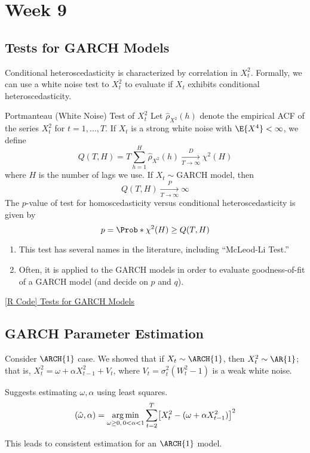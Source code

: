 \chapter{Week 9}
\section{Tests for GARCH Models}
Conditional heteroscedasticity is characterized by
correlation in $ X_t^2 $. Formally,
we can use a white noise test to $ X_t^2 $
to evaluate if $ X_t $ exhibits conditional heteroscedasticity.
\begin{Theorem}{Portmanteau (White Noise) Test of $ X_t^2 $}{}
    Let $ \hat{\rho}_{X^2}(h) $ denote the empirical ACF of the
    series $ X_t^2 $ for $ t=1,\ldots,T $. If $ X_t $
    is a strong white noise with $ \E{X^4}<\infty $, we define
    \[ Q(T,H)=T \sum_{h=1}^{H} \hat{\rho}_{X^2}(h)\xrightarrow[T\to\infty]{D}\chi^2(H) \]
    where $ H $ is the number of lags we use. If $ X_t \sim \text{GARCH} $
    model, then
    \[ Q(T,H)\xrightarrow[T\to\infty]{P}\infty \]
    The $ p $-value of test for homoscedasticity versus conditional
    heteroscedasticity is given by
    \[ p=\Prob*{\chi^2(H)\ge Q(T,H)} \]
\end{Theorem}
\begin{Remark}{}{}
    \begin{enumerate}[(1)]
        \item This test has several names in the literature, including
              ``McLeod-Li Test.''
        \item Often, it is applied to the GARCH models in order to evaluate goodness-of-fit
              of a GARCH model (and decide on $ p $ and $ q $).
    \end{enumerate}
\end{Remark}
\href{https://github.com/Hextical/university-notes/blob/master/year-3/semester-2/STAT 443/code/9.1 - Tests for GARCH Models.R}{[R Code] Tests for GARCH Models}
\section{GARCH Parameter Estimation}
Consider $ \ARCH{1} $ case. We showed that if $ X_t \sim \ARCH{1} $,
then $ X_t^2 \sim \AR{1} $; that is, $ X_t^2=\omega+\alpha X_{t-1}^2+V_t $,
where $ V_t=\sigma_t^2(W_t^2-1) $ is a weak white noise.

Suggests estimating $ \omega,\alpha $ using least squares.
\[ (\hat{\omega},\alpha)=\operatorname*{arg\,min}_{\omega\ge 0,\, 0<\alpha<1}\sum_{t=2}^{T} \bigl[X_t^2-(\omega+\alpha X_{t-1}^2)\bigr]^2 \]
\begin{Remark}{}{}
    This leads to consistent estimation for an $ \ARCH{1} $ model.
\end{Remark}

